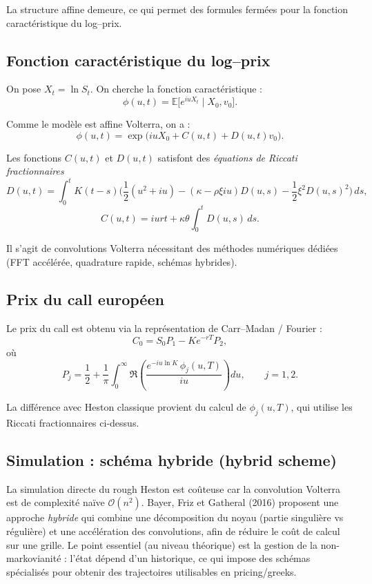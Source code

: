 \documentclass[11pt,a4paper]{article}
\newcommand{\1}{\mathbf{1}}
\begin{document}
La structure affine demeure, ce qui permet des formules fermées pour la fonction
caractéristique du log--prix.

\subsection*{Fonction caract\'eristique du log--prix}

On pose $X_t = \ln S_t$.
On cherche la fonction caractéristique :
\[
\phi(u,t)
=
\mathbb{E}\bigl[ e^{iu X_t} \mid X_0,v_0 \bigr].
\]

Comme le modèle est affine Volterra, on a :
\[
\phi(u,t)
=
\exp\!\bigl( iu X_0 + C(u,t) + D(u,t)v_0 \bigr).
\]

Les fonctions $C(u,t)$ et $D(u,t)$ satisfont des \emph{équations de Riccati fractionnaires}
\[
D(u,t) = \int_0^t K(t-s)
\biggl(
\frac12 (u^2+iu)
- (\kappa - \rho\xi iu) D(u,s)
- \frac12\xi^2 D(u,s)^2
\biggr)\, ds,
\]
\[
C(u,t) = iu r t + \kappa\theta \int_0^t D(u,s)\, ds.
\]

Il s'agit de convolutions Volterra nécessitant des méthodes numériques dédiées
(FFT accélérée, quadrature rapide, schémas hybrides).

\subsection*{Prix du call europ\'een}

Le prix du call est obtenu via la représentation de Carr--Madan / Fourier :
\[
C_0 = S_0 P_1 - K e^{-rT} P_2,
\]
où
\[
P_j
=
\frac12 + \frac1\pi
\int_0^\infty
\Re\left(
\frac{ e^{-iu\ln K}\, \phi_j(u,T) }{iu}
\right) du,
\qquad j=1,2.
\]

La différence avec Heston classique provient du calcul de $\phi_j(u,T)$, qui
utilise les Riccati fractionnaires ci-dessus.

\subsection*{Simulation : schéma hybride (hybrid scheme)}

La simulation directe du rough Heston est coûteuse car la convolution Volterra
est de complexité naïve $\mathcal{O}(n^2)$.
Bayer, Friz et Gatheral (2016) proposent une approche \emph{hybride} qui combine
une d\'ecomposition du noyau (partie singuli\`ere vs r\'eguli\`ere) et une acc\'el\'eration des convolutions,
afin de r\'eduire le co\^ut de calcul sur une grille. Le point essentiel (au niveau th\'eorique) est la gestion
de la non-markovianit\'e : l'\'etat d\'epend d'un historique, ce qui impose des sch\'emas sp\'ecialis\'es pour obtenir
des trajectoires utilisables en pricing/greeks.
\end{document}

